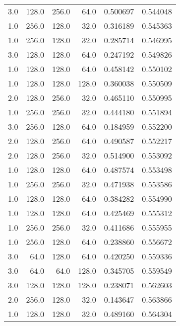 \begin{longtable}{rrrrrr}
        3.0 &     128.0 &       256.0 &     64.0 &      0.500697 &    0.544048 \\
        1.0 &     256.0 &       128.0 &     32.0 &      0.316189 &    0.545363 \\
        1.0 &     256.0 &       128.0 &     32.0 &      0.285714 &    0.546995 \\
        3.0 &     128.0 &       128.0 &     64.0 &      0.247192 &    0.549826 \\
        1.0 &     128.0 &       128.0 &     64.0 &      0.458142 &    0.550102 \\
        1.0 &     128.0 &       128.0 &    128.0 &      0.360038 &    0.550509 \\
        2.0 &     128.0 &       256.0 &     32.0 &      0.465110 &    0.550995 \\
        1.0 &     256.0 &       256.0 &     32.0 &      0.444180 &    0.551894 \\
        3.0 &     256.0 &       128.0 &     64.0 &      0.184959 &    0.552200 \\
        2.0 &     128.0 &       256.0 &     64.0 &      0.490587 &    0.552217 \\
        2.0 &     128.0 &       256.0 &     32.0 &      0.514900 &    0.553092 \\
        1.0 &     128.0 &       128.0 &     64.0 &      0.487574 &    0.553498 \\
        1.0 &     256.0 &       256.0 &     32.0 &      0.471938 &    0.553586 \\
        1.0 &     128.0 &       128.0 &     64.0 &      0.384282 &    0.554990 \\
        1.0 &     128.0 &       128.0 &     64.0 &      0.425469 &    0.555312 \\
        1.0 &     256.0 &       256.0 &     32.0 &      0.411686 &    0.555955 \\
        1.0 &     256.0 &       128.0 &     64.0 &      0.238860 &    0.556672 \\
        3.0 &      64.0 &       128.0 &     64.0 &      0.420250 &    0.559336 \\
        3.0 &      64.0 &        64.0 &    128.0 &      0.345705 &    0.559549 \\
        3.0 &     128.0 &       128.0 &    128.0 &      0.238071 &    0.562603 \\
        2.0 &     256.0 &       128.0 &     32.0 &      0.143647 &    0.563866 \\
        1.0 &     128.0 &       128.0 &     32.0 &      0.489160 &    0.564304 \\

\end{longtable}
